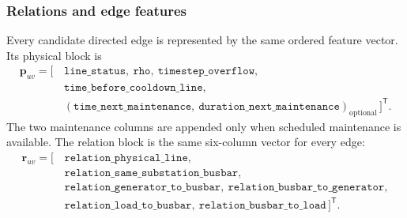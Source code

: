 \subsubsection{Relations and edge features}
\label{subsec:heterogeneous-relations}

Every candidate directed edge is represented by the same ordered feature
vector. Its physical block is
\begin{equation}
  \begin{split}
  \mathbf{p}_{uv} = [\,&
  \texttt{line\_status},\
  \texttt{rho},\
  \texttt{timestep\_overflow},\\
  &\texttt{time\_before\_cooldown\_line},\\
  &
  (\texttt{time\_next\_maintenance},\
  \texttt{duration\_next\_maintenance})_{\mathrm{optional}}
  \,]^{\mathsf T}.
  \end{split}
  \label{eq:heterogeneous-common-edge-physical-block}
\end{equation}
The two maintenance columns are appended only when scheduled maintenance is
available. The relation block is the same six-column vector for every edge:
\begin{equation}
  \begin{split}
  \mathbf{r}_{uv} = [\,&
  \texttt{relation\_physical\_line},\\
  &\texttt{relation\_same\_substation\_busbar},\\
  &\texttt{relation\_generator\_to\_busbar},\
  \texttt{relation\_busbar\_to\_generator},\\
  &\texttt{relation\_load\_to\_busbar},\
  \texttt{relation\_busbar\_to\_load}
  \,]^{\mathsf T}.
  \end{split}
  \label{eq:heterogeneous-common-edge-relation-block}
\end{equation}
